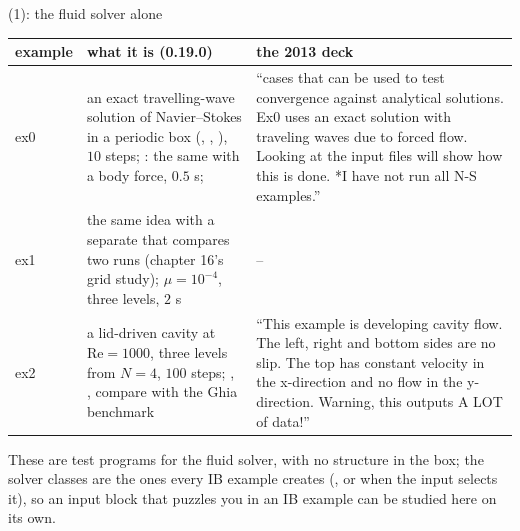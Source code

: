 \documentclass[aspectratio=169,11pt]{beamer}
\begin{document}
\begin{frame}{ (1): the fluid solver alone}
\label{fr:ns}
\scriptsize
\setlength{\tabcolsep}{3pt}
\begin{tabular}{@{}lL{0.5\textwidth}L{0.38\textwidth}@{}}
\toprule
example & what it is (0.19.0) & the 2013 deck\\
\midrule
ex0 & an exact travelling-wave solution of Navier--Stokes in a periodic box (, , ), $10$ steps; : the same with a body force, $0.5$ s;  & ``cases that can be used to test convergence against analytical solutions. Ex0 uses an exact solution with traveling waves due to forced flow. Looking at the input files will show how this is done. *I have not run all N-S examples.''\\
ex1 & the same idea with a separate  that compares two runs (chapter 16's grid study); $\mu = 10^{-4}$, three levels, $2$ s & --\\
ex2 & a lid-driven cavity at $\mathrm{Re} = 1000$, three levels from $N = 4$, $100$ steps; , ,  compare with the Ghia benchmark & ``This example is developing cavity flow. The left, right and bottom sides are no slip. The top has constant velocity in the x-direction and no flow in the y-direction. Warning, this outputs A LOT of data!''\\
\bottomrule
\end{tabular}
\vspace{1mm}

\scriptsize These are test programs for the fluid solver, with no structure in the box; the solver classes are the ones every IB example creates (, or  when the input selects it), so an input block that puzzles you in an IB example can be studied here on its own.
\end{frame}
\end{document}
